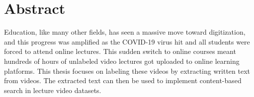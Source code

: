 \chapter*{Abstract}
Education, like many other fields, has seen a massive move toward digitization, and this progress was amplified as the COVID-19 virus hit and all students were forced to attend online lectures. This sudden switch to online courses meant hundreds of hours of unlabeled video lectures got uploaded to online learning platforms. This thesis focuses on labeling these videos by extracting written text from videos. The extracted text can then be used to implement content-based search in lecture video datasets.